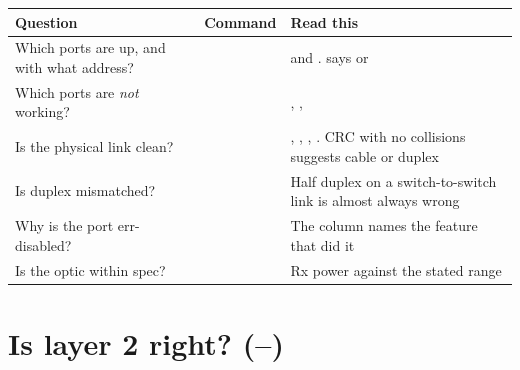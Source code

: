 \begin{longtable}{@{}L{4.4cm}L{5.6cm}L{5.3cm}@{}}
\toprule
{}
\textbf{Question} & \textbf{Command} & \textbf{Read this} \\
\midrule
\endhead
Which ports are up, and with what address? &
 &
 and .  says  or  \\
Which ports are \emph{not} working? &
 &
, ,  \\
Is the physical link clean? &
 &
, , , . CRC with no
collisions suggests cable or duplex \\
Is duplex mismatched? &
 &
Half duplex on a switch-to-switch link is almost always wrong \\
Why is the port err-disabled? &
 &
The  column names the feature that did it \\
Is the optic within spec? &
 &
Rx power against the stated range \\
\bottomrule
\end{longtable}

\section{Is layer 2 right? \textnormal{(--)}}

